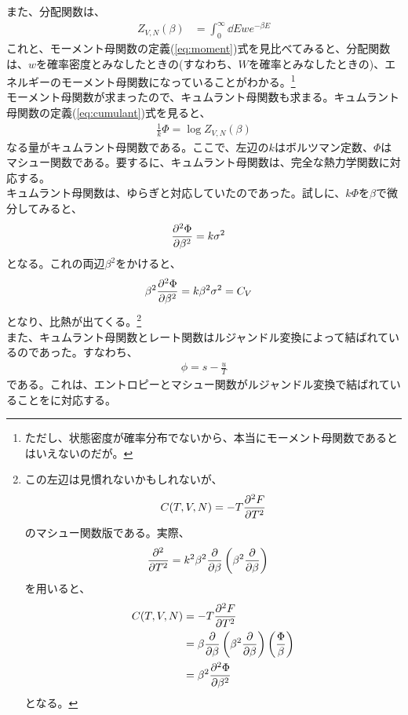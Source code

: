\documentclass[a4paper,11pt]{jsarticle}
\numberwithin{equation}{section}
\begin{document}
また、分配関数は、
\begin{align}
  Z_{V,N}(\beta) &= \int_{0}^{\infty}\dd E w e^{-\beta E}
\end{align}
これと、モーメント母関数の定義(\ref{eq:moment})式を見比べてみると、分配関数は、$w$を確率密度とみなしたときの(すなわち、$W$を確率とみなしたときの)、エネルギーのモーメント母関数になっていることがわかる。\footnote{ただし、状態密度が確率分布でないから、本当にモーメント母関数であるとはいえないのだが。}\\
モーメント母関数が求まったので、キュムラント母関数も求まる。キュムラント母関数の定義(\ref{eq:cumulant})式を見ると、
\begin{align}
  \frac{1}{k}\Phi = \log Z_{V,N}(\beta)
\end{align}
なる量がキュムラント母関数である。ここで、左辺の$k$はボルツマン定数、$\Phi$はマシュー関数である。要するに、キュムラント母関数は、完全な熱力学関数に対応する。\\
キュムラント母関数は、ゆらぎと対応していたのであった。試しに、$k\Phi$を$\beta$で微分してみると、
\begin{align}
  \pdv[2] {\Phi}{\beta} &= k\sigma^2
\end{align}
となる。これの両辺$\beta^2$をかけると、
\begin{align}
  \beta^2\pdv[2] {\Phi}{\beta} &= k\beta^2\sigma^2 =C_{V}
\end{align}
となり、比熱が出てくる。\footnote{この左辺は見慣れないかもしれないが、
\begin{align}
  C(T,V,N) = -T\pdv[2]{F}{T}
\end{align}
のマシュー関数版である。実際、
\begin{align}
  \pdv[2]{T} &= k^2\beta^2\pdv{\beta}\left(\beta^2 \pdv{\beta}\right)
\end{align}
を用いると、
\begin{align}
  C(T,V,N) &= -T\pdv[2]{F}{T}\\
  &=\beta\pdv{\beta}\left(\beta^2\pdv{\beta}\right)\left(\frac{\Phi}{\beta}\right)\\
  &=\beta^2\pdv[2]{\Phi}{\beta}
\end{align}
となる。}\\

また、キュムラント母関数とレート関数はルジャンドル変換によって結ばれているのであった。すなわち、
\begin{align}
  \phi = s - \frac{u}{T}
\end{align}
である。これは、エントロピーとマシュー関数がルジャンドル変換で結ばれていることをに対応する。\\
\end{document}
